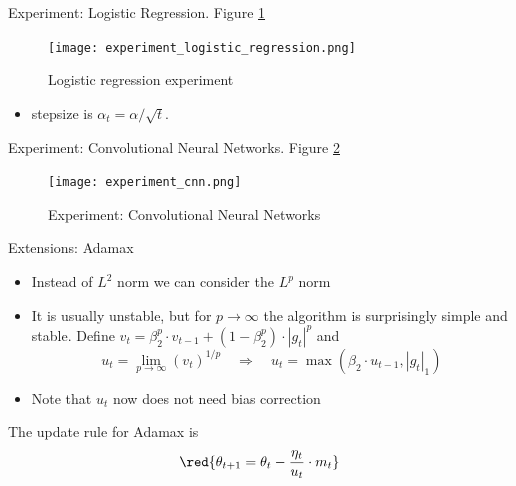 \documentclass[english]{article}
\begin{document}

\item {Experiment: Logistic Regression}. Figure \ref{experiment_logistic_regression}

\begin{figure}
 \centering
\texttt{[image: experiment\_logistic\_regression.png]}
\caption{Logistic regression experiment}
\label{experiment_logistic_regression}
\end{figure}



\begin{itemize}
\item stepsize is $\alpha_t = \alpha/\sqrt{t}$.
\end{itemize}









\item {Experiment: Convolutional Neural Networks}. Figure \ref{experiment_cnn}

\begin{figure}
 \centering
\texttt{[image: experiment\_cnn.png]}
\caption{Experiment: Convolutional Neural Networks}
\label{experiment_cnn}
\end{figure}










\item {Extensions: Adamax}

\begin{itemize}
\item Instead of $L^2$ norm we can consider the $L^p$ norm
\item It is usually unstable, but for $p \to \infty$ the algorithm is surprisingly simple and stable. Define $v_t = \beta_2^p\cdot v_{t-1} + (1-\beta_2^p) \cdot |g_t|^p$ and
$$u_t = \lim_{p\to\infty} (v_t)^{1/p} \quad \Rightarrow\quad u_t = \max(\beta_2 \cdot u_{t-1}, |g_t|_1)$$
\item Note that $u_t$ now does not need bias correction
\end{itemize}


The update rule for Adamax is
$$\red{\theta_{t+1} = \theta_t - \frac{\eta_t}{u_t} \cdot m_t}$$
\end{document}
